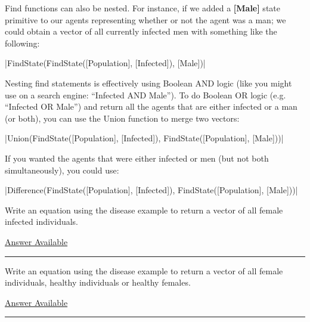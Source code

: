 \documentclass[]{memoir}
\newcommand{\FunctionTok}[1]{\textcolor[rgb]{0.02,0.16,0.49}{{#1}}}
\newcommand{\NormalTok}[1]{{#1}}
\newcommand{\p}[1]{\textbf{{[}#1{]}}}
\begin{document}
Find functions can also be nested. For instance, if we added a \p{Male}
state primitive to our agents representing whether or not the agent was
a man; we could obtain a vector of all currently infected men with
something like the following:

|\FunctionTok{FindState}\NormalTok{(}\FunctionTok{FindState}\NormalTok{([Population], [Infected]), [Male])}|

Nesting find statements is effectively using Boolean AND logic (like you
might use on a search engine: ``Infected AND Male''). To do Boolean OR
logic (e.g. ``Infected OR Male'') and return all the agents that are
either infected or a man (or both), you can use the Union function to
merge two vectors:

|\FunctionTok{Union}\NormalTok{(}\FunctionTok{FindState}\NormalTok{([Population], [Infected]), }\FunctionTok{FindState}\NormalTok{([Population], [Male]))}|

If you wanted the agents that were either infected or men (but not both
simultaneously), you could use:

|\FunctionTok{Difference}\NormalTok{(}\FunctionTok{FindState}\NormalTok{([Population], [Infected]), }\FunctionTok{FindState}\NormalTok{([Population], [Male]))}|


Write an equation using the disease example to return a vector of all
female infected individuals.

\hyperref[Ans-13-8]{Answer Available}

\begin{center}\rule{3in}{0.4pt}\end{center}


Write an equation using the disease example to return a vector of all
female individuals, healthy individuals or healthy females.

\hyperref[Ans-13-9]{Answer Available}

\begin{center}\rule{3in}{0.4pt}\end{center}
\end{document}
